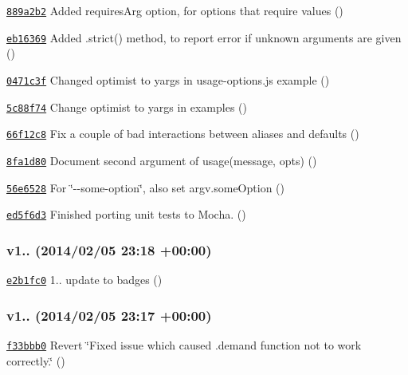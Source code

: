 \begin{DoxyItemize}
\item \href{https://github.com/bcoe/yargs/commit/889a2b28eb9768801b05163360a470d0fd6c8b79}{\tt 889a2b2} Added requires\+Arg option, for options that require values ()
\item \href{https://github.com/bcoe/yargs/commit/eb163692262be1fe80b992fd8803d5923c5a9b18}{\tt eb16369} Added .strict() method, to report error if unknown arguments are given ()
\item \href{https://github.com/bcoe/yargs/commit/0471c3fd999e1ad4e6cded88b8aa02013b66d14f}{\tt 0471c3f} Changed optimist to yargs in usage-\/options.\+js example ()
\item \href{https://github.com/bcoe/yargs/commit/5c88f74e3cf031b17c54b4b6606c83e485ff520e}{\tt 5c88f74} Change optimist to yargs in examples ()
\item \href{https://github.com/bcoe/yargs/commit/66f12c82ba3c943e4de8ca862980e835da8ecb3a}{\tt 66f12c8} Fix a couple of bad interactions between aliases and defaults ()
\item \href{https://github.com/bcoe/yargs/commit/8fa1d80f14b03eb1f2898863a61f1d1615bceb50}{\tt 8fa1d80} Document second argument of usage(message, opts) ()
\item \href{https://github.com/bcoe/yargs/commit/56e6528cf674ff70d63083fb044ff240f608448e}{\tt 56e6528} For \char`\"{}-\/-\/some-\/option\char`\"{}, also set argv.\+some\+Option ()
\item \href{https://github.com/bcoe/yargs/commit/ed5f6d33f57ad1086b11c91b51100f7c6c7fa8ee}{\tt ed5f6d3} Finished porting unit tests to Mocha. ()
\end{DoxyItemize}

\subsubsection*{v1.. (2014/02/05 23\+:18 +00\+:00)}


\begin{DoxyItemize}
\item \href{https://github.com/bcoe/yargs/commit/e2b1fc0c4a59cf532ae9b01b275e1ef57eeb64d2}{\tt e2b1fc0} 1.. update to badges ()
\end{DoxyItemize}

\subsubsection*{v1.. (2014/02/05 23\+:17 +00\+:00)}


\begin{DoxyItemize}
\item \href{https://github.com/bcoe/yargs/commit/f33bbb0f00fe18960f849cc8e15a7428a4cd59b8}{\tt f33bbb0} Revert \char`\"{}\+Fixed issue which caused .\+demand function not to work correctly.\char`\"{} ()
\end{DoxyItemize}

